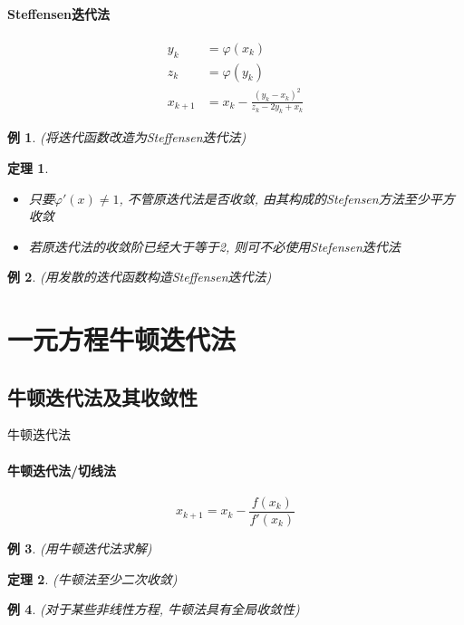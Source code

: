 \documentclass[twoside]{article}
\newtheorem{theorem}{定理}[section]
\newtheorem{eg}{例}[section]
\begin{document}
\paragraph{Steffensen迭代法}
\begin{equation}
  \begin{aligned}
    y_k &= \varphi(x_k)\\
    z_k &= \varphi(y_k)\\
    x_{k+1} &= x_k - \frac{{(y_k-x_k)}^2}{z_k-2y_k+x_k}
  \end{aligned}
\end{equation}
\begin{eg}
  (将迭代函数改造为Steffensen迭代法)
\end{eg}
\begin{theorem}
  \begin{itemize}
    \item 只要$\varphi'(x)\ne1$, 不管原迭代法是否收敛, 由其构成的Stefensen方法至少平方收敛
    \item 若原迭代法的收敛阶已经大于等于2, 则可不必使用Stefensen迭代法
  \end{itemize}
\end{theorem}
\begin{eg}
  (用发散的迭代函数构造Steffensen迭代法)
\end{eg}

\section{一元方程牛顿迭代法}
\subsection{牛顿迭代法及其收敛性}
牛顿迭代法
\paragraph{牛顿迭代法/切线法}
\begin{equation}
  x_{k+1} = x_k - \frac{f(x_k)}{f'(x_k)}
\end{equation}
\begin{eg}
  (用牛顿迭代法求解)
\end{eg}
\begin{theorem}
  (牛顿法至少二次收敛)
\end{theorem}
\begin{eg}
  (对于某些非线性方程, 牛顿法具有全局收敛性)
\end{eg}
\end{document}
